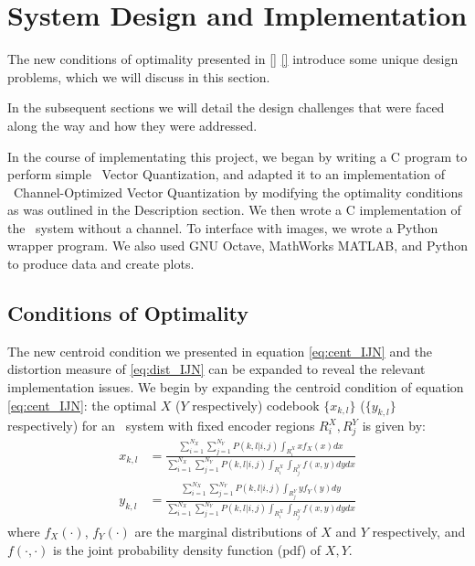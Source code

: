 \section{System Design and Implementation}
The new conditions of optimality presented in \eqref{} \eqref{} introduce some unique design problems, which we will discuss in this section.

In the subsequent sections we will detail the design challenges that were faced along the way and how they were addressed.

In the course of implementating this project, we began by writing a C program to perform simple \sysII\ Vector Quantization, and adapted it to an implementation of \sysIIN\ Channel-Optimized Vector Quantization by modifying the optimality conditions as was outlined in the Description section. We then wrote a C implementation of the \sysIJ\ system without a channel. To interface with images, we wrote a Python wrapper program. We also used GNU Octave, MathWorks MATLAB, and Python to produce data and create plots.

\subsection{Conditions of Optimality}
The new centroid condition we presented in equation \eqref{eq:cent_IJN} and the distortion measure of \eqref{eq:dist_IJN} can be expanded to reveal the relevant implementation issues. We begin by expanding the centroid condition of equation \eqref{eq:cent_IJN}: the optimal $X$ ($Y$ respectively) codebook $\{x_{k,l}\}$ ($\{y_{k,l}\}$ respectively) for an \sysIJN\ system with fixed encoder regions $R_i^X, R_j^Y$ is given by:
\begin{align}
    \label{eq:int_cent_IJN_x}
    x_{k,l}
    &= \frac{
        \sum_{i=1}^{N_X}\sum_{j=1}^{N_Y}
            P(k,l|i,j)\int_{R_i^X}xf_X(x)dx
    }{
        \sum_{i=1}^{N_X}\sum_{j=1}^{N_Y}
            P(k,l|i,j)\int_{R_i^X}\int_{R_j^Y}f(x,y)dydx
    }\\
    \label{eq:int_cent_IJN_y}
    y_{k,l}
    &= \frac{
        \sum_{i=1}^{N_X}\sum_{j=1}^{N_Y}
            P(k,l|i,j)\int_{R_j^Y}yf_Y(y)dy
    }{
        \sum_{i=1}^{N_X}\sum_{j=1}^{N_Y}
            P(k,l|i,j)\int_{R_i^X}\int_{R_j^Y}f(x,y)dydx
    }
\end{align}
where $f_X(\cdot)$, $f_Y(\cdot)$ are the marginal distributions of $X$ and $Y$ respectively, and $f(\cdot,\cdot)$ is the joint probability density function (pdf) of $X,Y$.

